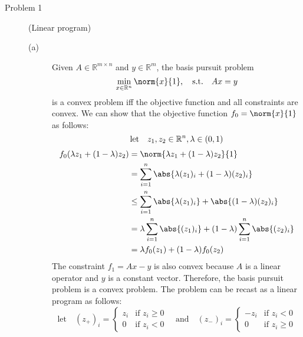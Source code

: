 \documentclass[11pt]{article}
\begin{document}
\begin{description}
\item[Problem 1] (Linear program) 

\begin{description}
    \item[(a)] 
    Given $A \in \mathbb{R}^{m \times n}$ and $y \in \mathbb{R}^m$,
    the basis pursuit problem
    \begin{equation*}
        \min_{x \in \mathbb{R}^n} \norm{x}{1}, \quad \text{s.t.} \quad Ax = y
    \end{equation*}
    is a convex problem iff the objective function and all constraints are convex.
    We can show that the objective function $f_0 = \norm{x}{1}$ as follows:
    \begin{equation*}
        \text{let} \quad z_1,z_2 \in \mathbb{R}^n, \lambda \in (0,1) \\
    \end{equation*}
    \begin{equation*}
        \begin{aligned}
            f_0(\lambda z_1 + (1-\lambda)z_2) 
            &= \norm{\lambda z_1 + (1-\lambda)z_2}{1} \\
            &= \sum_{i=1}^{n} \abs{\lambda (z_1)_i + (1-\lambda)(z_2)_i} \\
            &\leq \sum_{i=1}^{n} \abs{\lambda (z_1)_i} + \abs{(1-\lambda)(z_2)_i} \\
            &= \lambda \sum_{i=1}^{n} \abs{(z_1)_i} + (1-\lambda) \sum_{i=1}^{n} \abs{(z_2)_i} \\
            &= \lambda f_0(z_1) + (1-\lambda) f_0(z_2)
        \end{aligned}
    \end{equation*}
    The constraint $f_1 = Ax - y$ is also convex because $A$ is a linear operator and $y$ is a constant vector.
    Therefore, the basis pursuit problem is a convex problem.
    The problem can be recast as a linear program as follows:
    \begin{equation*}
        \text{let} \quad (z_+)_i = \begin{cases}
            z_i & \text{if } z_i \geq 0 \\
            0 & \text{if } z_i < 0
        \end{cases}
        \quad \text{and} \quad (z_-)_i = \begin{cases}
            -z_i & \text{if } z_i < 0 \\
            0 & \text{if } z_i \geq 0
        \end{cases}

\end{equation*}
\end{description}
\end{description}
\end{document}
